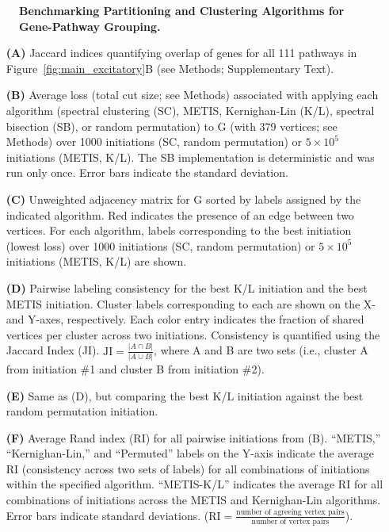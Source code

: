 \begin{figure}[H]
\begin{subfigure}[t]{0.33\textwidth}
    \end{subfigure}
    \caption{
        \textbf{Benchmarking Partitioning and Clustering Algorithms for Gene-Pathway Grouping.}\\
    }
    \label{fig:benchmarking_clustering}
\end{figure}
\begin{itemize}
    \item[\textbf{(A)}] Jaccard indices quantifying overlap of genes for all 111 pathways in Figure~\ref{fig:main_excitatory}B (see Methods; Supplementary Text). 
    \item[\textbf{(B)}] Average loss (total cut size; see Methods) associated with applying each algorithm (spectral clustering (SC), METIS, Kernighan-Lin (K/L), spectral bisection (SB), or random permutation) to G (with 379 vertices; see Methods) over 1000 initiations (SC, random permutation) or $5 \times 10^5$ initiations (METIS, K/L). The SB implementation is deterministic and was run only once. Error bars indicate the standard deviation. 
    \item[\textbf{(C)}] Unweighted adjacency matrix for G sorted by labels assigned by the indicated algorithm. Red indicates the presence of an edge between two vertices. For each algorithm, labels corresponding to the best initiation (lowest loss) over 1000 initiations (SC, random permutation) or $5 \times 10^5$ initiations (METIS, K/L) are shown. 
    \item[\textbf{(D)}] Pairwise labeling consistency for the best K/L initiation and the best METIS initiation. Cluster labels corresponding to each are shown on the X- and Y-axes, respectively. Each color entry indicates the fraction of shared vertices per cluster across two initiations. Consistency is quantified using the Jaccard Index (JI). $\text{JI} = \frac{|A \cap B|}{|A \cup B|}$, where A and B are two sets (i.e., cluster A from initiation \#1 and cluster B from initiation \#2). 
    \item[\textbf{(E)}] Same as (D), but comparing the best K/L initiation against the best random permutation initiation. 
    \item[\textbf{(F)}] Average Rand index (RI) for all pairwise initiations from (B). “METIS,” “Kernighan-Lin,” and “Permuted” labels on the Y-axis indicate the average RI (consistency across two sets of labels) for all combinations of initiations within the specified algorithm. “METIS-K/L” indicates the average RI for all combinations of initiations across the METIS and Kernighan-Lin algorithms. Error bars indicate standard deviations. ($\text{RI} = \frac{\text{number of agreeing vertex pairs}}{\text{number of vertex pairs}}$).
\end{itemize}